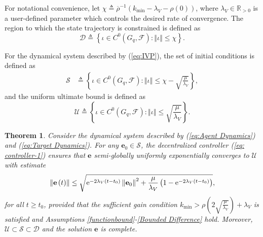 \documentclass[letterpaper, 10 pt, conference]{ieeeconf}
\newcommand{\FF}{\mathcal{F}}
\newtheorem{theorem}{Theorem}
\theoremstyle{definition}
\begin{document}
For notational convenience, let $\chi \triangleq \overline{\rho}^{-1}\left(k_{\min}-\lambda_{V}-\rho\left(0\right)\right)$, where $\lambda_{V}\in\mathbb{R}_{>0}$ is a user-defined parameter
which controls the desired rate of convergence. The region to which the
state trajectory is constrained is defined as
\begin{equation}
\mathcal{D}\triangleq\left\{ \iota\in C^0(G_q,\FF) : \left\Vert \iota\right\Vert \leq \chi \right\}.\label{eq:state space}
\end{equation}

For the dynamical
system described by (\ref{eq:IVP}), the set of initial conditions
is defined as
\begin{equation}
\begin{aligned}\mathcal{S} & \triangleq\left\{ \iota\in C^0(G_q,\FF) :\left\Vert \iota\right\Vert \leq \chi -\sqrt{\frac{\mu}{\lambda_{V}}}\right\} ,\end{aligned}
\label{eq:initial conditions}
\end{equation}
and the uniform ultimate bound is defined as
\begin{equation}
\mathcal{U}\triangleq\left\{ \iota\in C^0(G_q,\FF) :\left\Vert \iota\right\Vert \leq\sqrt{\frac{\mu}{\lambda_{V}}}\right\} .\label{eq:equilibrium set}
\end{equation}

\begin{theorem}
\label{thm:}Consider the dynamical system described by (\ref{eq:Agent Dynamics})
and (\ref{eq:Target Dynamics}). For any $\mathbf{e}_0 \in\mathcal{S}$,
the decentralized controller (\ref{eq: controller-1}) ensures that
$\mathbf{e}$ semi-globally uniformly exponentially converges to
$\mathcal{U}$ with estimate{\small{}
\[
\left\Vert \mathbf{e}\left(t\right)\right\Vert \leq\sqrt{{\rm e}^{-2\lambda_{V}\left(t-t_{0}\right)}\left\Vert \mathbf{e}_{0}\right\Vert ^{2}+\frac{\mu}{\lambda_{V}}\left(1-{\rm e}^{-2\lambda_{V}\left(t-t_{0}\right)}\right)},
\]
}for all $t\geq t_{0}$, provided that the sufficient gain condition
$k_{\min}>\rho\left(2\sqrt{\frac{\mu}{\lambda_{V}}}\right)+\lambda_{V}$
is satisfied and Assumptions \ref{functionbound}-\ref{Bounded Difference}
hold. Moreover, $\mathcal{U}\subset\mathcal{S}\subset\mathcal{D}$
and the solution $\mathbf{e}$ is complete.
\end{theorem}
\end{document}

